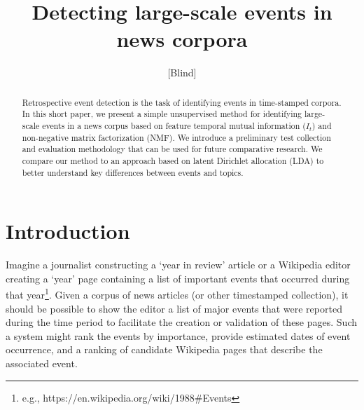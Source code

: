 \documentclass{sig-alternate}
\begin{document}

\author{[Blind]}

\title{Detecting large-scale events in news corpora}

\maketitle
\begin{abstract}
Retrospective event detection is the task of identifying events in time-stamped corpora. In this short paper, we present a simple unsupervised method for identifying large-scale events in a news corpus based on feature temporal mutual information ($I_t$) and non-negative matrix factorization (NMF). We introduce a preliminary test collection and evaluation methodology that can be used for future comparative research. We compare our method to an approach based on latent Dirichlet allocation (LDA) to better understand key differences between events and topics.

\end{abstract}



\section{Introduction}

Imagine a journalist constructing a `year in review' article or a Wikipedia editor creating a `year' page containing a list of important events that occurred during that year\footnote{e.g., https://en.wikipedia.org/wiki/1988\#Events}. Given a corpus of news articles (or other timestamped collection), it should be possible to show the editor a list of major events that were reported during the time period to facilitate the creation or validation of these pages. Such a system might rank the events by importance, provide estimated dates of event occurrence, and a ranking of candidate Wikipedia pages that describe the associated event. 
\end{document}
